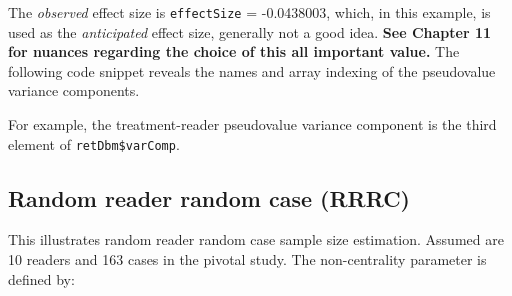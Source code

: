 \documentclass[]{book}
\newenvironment{Shaded}{\begin{snugshade}}{\end{snugshade}}
\newcommand{\CommentTok}[1]{\textcolor[rgb]{0.56,0.35,0.01}{\textit{#1}}}
\newcommand{\DataTypeTok}[1]{\textcolor[rgb]{0.13,0.29,0.53}{#1}}
\newcommand{\FloatTok}[1]{\textcolor[rgb]{0.00,0.00,0.81}{#1}}
\newcommand{\KeywordTok}[1]{\textcolor[rgb]{0.13,0.29,0.53}{\textbf{#1}}}
\newcommand{\NormalTok}[1]{#1}
\newcommand{\OperatorTok}[1]{\textcolor[rgb]{0.81,0.36,0.00}{\textbf{#1}}}
\newcommand{\StringTok}[1]{\textcolor[rgb]{0.31,0.60,0.02}{#1}}
\begin{document}
\begin{Shaded}
\end{Shaded}

The \emph{observed} effect size is \texttt{effectSize} = -0.0438003, which, in this example, is used as the \emph{anticipated} effect size, generally not a good idea. \textbf{See Chapter 11 for nuances regarding the choice of this all important value.} The following code snippet reveals the names and array indexing of the pseudovalue variance components.

\begin{Shaded}
\end{Shaded}

For example, the treatment-reader pseudovalue variance component is the third element of \texttt{retDbm\$varComp}.

\hypertarget{random-reader-random-case-rrrc}{%
\subsection{Random reader random case (RRRC)}\label{random-reader-random-case-rrrc}}

This illustrates random reader random case sample size estimation. Assumed are 10 readers and 163 cases in the pivotal study. The non-centrality parameter is defined by:
\end{document}
